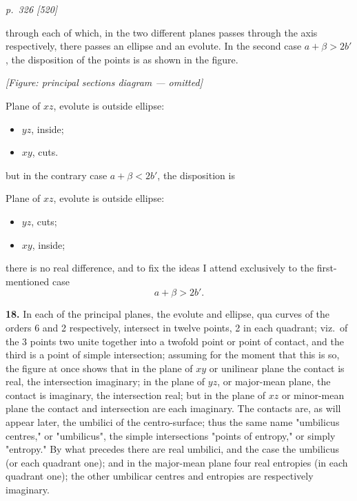 \documentclass[11pt,a4paper]{article}
\theoremstyle{plain}
\theoremstyle{definition}
\begin{document}
\clearpage

\bigskip
\textit{p.~326 [520]}
\smallskip

through each of which, in the two different planes passes through the axis respectively, there passes an ellipse and an evolute. In the second case $a + \beta > 2b'$, the disposition of the points is as shown in the figure.

\begin{center}
\textit{[Figure: principal sections diagram --- omitted]}
\end{center}

Plane of $xz$, evolute is outside ellipse:
\begin{itemize}[leftmargin=2em]
\item[] $yz$, inside;
\item[] $xy$, cuts.
\end{itemize}

but in the contrary case $a + \beta < 2b'$, the disposition is

Plane of $xz$, evolute is outside ellipse:
\begin{itemize}[leftmargin=2em]
\item[] $yz$, cuts;
\item[] $xy$, inside;
\end{itemize}

there is no real difference, and to fix the ideas I attend exclusively to the first-mentioned case
\[
a + \beta > 2b'.
\]

\textbf{18.} In each of the principal planes, the evolute and ellipse, qua curves of the orders 6 and 2 respectively, intersect in twelve points, 2 in each quadrant; viz.\ of the 3 points two unite together into a twofold point or point of contact, and the third is a point of simple intersection; assuming for the moment that this is so, the figure at once shows that in the plane of $xy$ or unilinear plane the contact is real, the intersection imaginary; in the plane of $yz$, or major-mean plane, the contact is imaginary, the intersection real; but in the plane of $xz$ or minor-mean plane the contact and intersection are each imaginary. The contacts are, as will appear later, the umbilici of the centro-surface; thus the same name "umbilicus centres," or "umbilicus", the simple intersections "points of entropy," or simply "entropy." By what precedes there are real umbilici, and the case the umbilicus (or each quadrant one); and in the major-mean plane four real entropies (in each quadrant one); the other umbilicar centres and entropies are respectively imaginary.
\end{document}
